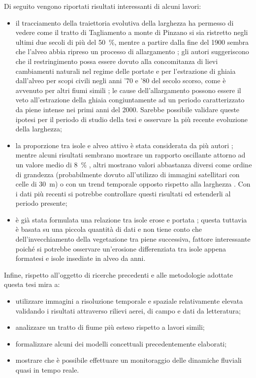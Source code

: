 Di seguito vengono riportati risultati interessanti di alcuni lavori: 
%
\begin{itemize}
	\item il tracciamento della traiettoria evolutiva della larghezza ha permesso di vedere come il tratto di Tagliamento a monte di Pinzano si sia ristretto negli ultimi due secoli di più del \SI{50}{\percent}, mentre a partire dalla fine del 1900 sembra che l'alveo abbia ripreso un processo di allargamento ;
	gli autori suggeriscono che il restringimento possa essere dovuto alla concomitanza di lievi cambiamenti naturali nel regime delle portate e per l'estrazione di ghiaia dall'alveo per scopi civili negli anni '70 e '80 del secolo scorso, come è avvenuto per altri fiumi simili ;
	le cause dell'allargamento possono essere il veto all'estrazione della ghiaia congiuntamente ad un periodo caratterizzato da piene intense nei primi anni del 2000.
	Sarebbe possibile validare queste ipotesi per il periodo di studio della tesi e osservare la più recente evoluzione della larghezza;
	\item la proporzione tra isole e alveo attivo è stata considerata da più autori ; 
	mentre alcuni risultati sembrano mostrare un rapporto oscillante attorno ad un valore medio di \SI{8}{\percent} , altri mostrano valori abbastanza diversi come ordine di grandezza  (probabilmente dovuto all'utilizzo di immagini satellitari con celle di \SI{30}{\m}) o con un trend temporale opposto rispetto alla larghezza .
	Con i dati più recenti si potrebbe controllare questi risultati ed estenderli al periodo presente;
	\item è già stata formulata una relazione tra isole erose e portata ;
	questa tuttavia è basata su una piccola quantità di dati e non tiene conto che dell'invecchiamento della vegetazione tra piene successiva, fattore interessante poiché si potrebbe osservare un'erosione differenziata tra isole appena formatesi e isole insediate in alveo da anni.
\end{itemize}

Infine, rispetto all'oggetto di ricerche precedenti e alle metodologie adottate questa tesi mira a:
%
\begin{itemize}
	\item utilizzare immagini a risoluzione temporale e spaziale relativamente elevata validando i risultati attraverso rilievi aerei, di campo e dati da letteratura;
	\item analizzare un tratto di fiume più esteso rispetto a lavori simili;
	\item formalizzare alcuni dei modelli concettuali precedentemente elaborati;	
	\item mostrare che è possibile effettuare un monitoraggio delle dinamiche fluviali quasi in tempo reale. 
\end{itemize}

